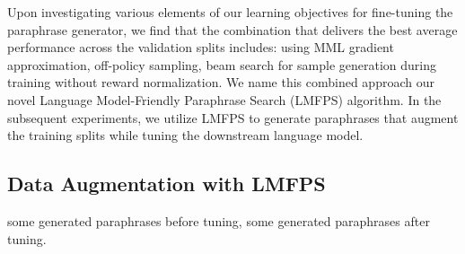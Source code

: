 \documentclass[11pt]{article}
\begin{document}
Upon investigating various elements of our learning objectives for fine-tuning the paraphrase generator, we find that the combination that delivers the best average performance across the validation splits includes: using MML gradient approximation, off-policy sampling, beam search for sample generation during training without reward normalization. We name this combined approach our novel Language Model-Friendly Paraphrase Search (LMFPS) algorithm. In the subsequent experiments, we utilize LMFPS to generate paraphrases that augment the training splits while tuning the downstream language model.

\subsection{Data Augmentation with LMFPS}
some generated paraphrases before tuning, some generated paraphrases after tuning.
\end{document}
